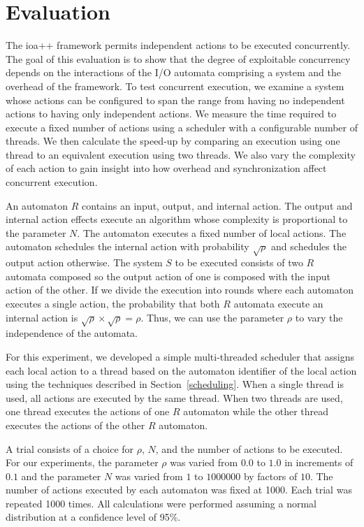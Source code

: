 \section{Evaluation\label{evaluation}}

The ioa++ framework permits independent actions to be executed concurrently.
The goal of this evaluation is to show that the degree of exploitable concurrency depends on the interactions of the I/O automata comprising a system and the overhead of the framework.
To test concurrent execution, we examine a system whose actions can be configured to span the range from having no independent actions to having only independent actions.
We measure the time required to execute a fixed number of actions using a scheduler with a configurable number of threads.
We then calculate the speed-up by comparing an execution using one thread to an equivalent execution using two threads.
We also vary the complexity of each action to gain insight into how overhead and synchronization affect concurrent execution.

An automaton $R$ contains an input, output, and internal action.
The output and internal action effects execute an algorithm whose complexity is proportional to the parameter $N$.
The automaton executes a fixed number of local actions.
The automaton schedules the internal action with probability $\sqrt{\rho}$ and schedules the output action otherwise.
The system $S$ to be executed consists of two $R$ automata composed so the output action of one is composed with the input action of the other.
If we divide the execution into rounds where each automaton executes a single action, the probability that both $R$ automata execute an internal action is $\sqrt{\rho} \times \sqrt{\rho} = \rho$.
Thus, we can use the parameter $\rho$ to vary the independence of the automata.

For this experiment, we developed a simple multi-threaded scheduler that assigns each local action to a thread based on the automaton identifier of the local action using the techniques described in Section~\ref{scheduling}.
When a single thread is used, all actions are executed by the same thread.
When two threads are used, one thread executes the actions of one $R$ automaton while the other thread executes the actions of the other $R$ automaton.

A trial consists of a choice for $\rho$, $N$, and the number of actions to be executed.
For our experiments, the parameter $\rho$ was varied from $0.0$ to $1.0$ in increments of $0.1$ and the parameter $N$ was varied from $1$ to $1000000$ by factors of $10$.
The number of actions executed by each automaton was fixed at 1000.
Each trial was repeated 1000 times.
All calculations were performed assuming a normal distribution at a confidence level of 95\%.

